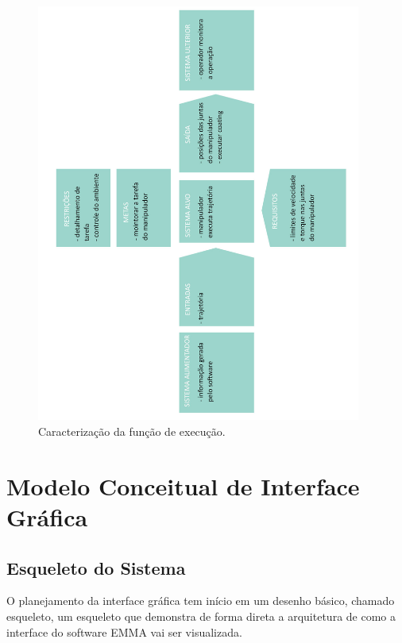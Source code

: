 \documentclass[12pt,a4paper]{article}
\begin{document}
\begin{figure}[H] 
\begin{center} 
  \includegraphics[width=0.95\textwidth]{figs/caracterizacao_execucao.jpg}
  \caption{Caracterização da função de execução.}
  \label{fig:caracterizacao_execucao}
\end{center}
\end{figure} 


\section {Modelo Conceitual de Interface Gráfica}

\subsection {Esqueleto do Sistema}
O planejamento da interface gráfica tem início em um desenho básico, chamado
esqueleto, um esqueleto que demonstra de forma direta a arquitetura de como a
interface do software EMMA vai ser visualizada.
\end{document}
